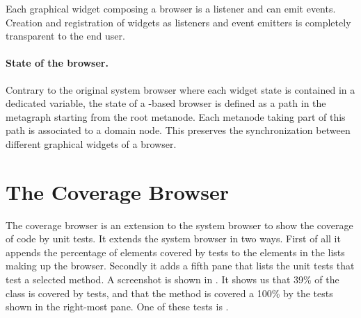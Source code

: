 \documentclass[a4paper,10pt,twoside]{book}
\begin{document}
Each graphical widget composing a browser is a listener and can emit events. Creation and registration of widgets as listeners and event emitters is completely transparent to the end user.



\paragraph{State of the browser.} Contrary to the original \pharo system browser where each widget state is contained in a dedicated variable, the state of a \obf-based browser is defined as a path in the metagraph starting from the root metanode. Each metanode taking part of this path is associated to a domain node. This preserves the synchronization between different graphical widgets of a browser.



\section{The Coverage Browser}\label{sec:coverageBrowser}

The coverage browser is an extension to the system browser to show the coverage of code by unit tests.
It extends the system browser in two ways.
First of all it appends the percentage of elements covered by tests to the elements in the lists making up the browser. Secondly it adds a fifth pane that lists the unit tests that test a selected method. 
A screenshot is shown in .
It shows us that 39\% of the class  is covered by tests, and that the method  is covered a 100\% by the tests shown in the right-most pane. One of these tests is .
\end{document}
